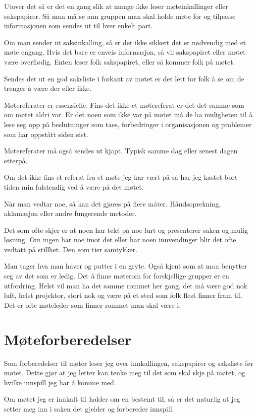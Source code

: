 \documentclass[12pt, a4paper]{article}
\begin{document}
Utover det så er det en gang slik at mange ikke leser møteinkallinger eller
sakspapirer. Så man må se ann gruppen man skal holde møte for og tilpasse
informasjonen som sendes ut til hver enkelt part.

Om man sender ut saksinkalling, så er det ikke sikkert det er nødvendig med et
møte engang. Hvis det bare er enveis informasjon, så vil sakspapiret eller
møtet være overflødig. Enten leser folk sakspapiret, eller så kommer folk på
møtet. 

Sendes det ut en god saksliste i forkant av møtet er det lett for folk å se om
de trenger å være der eller ikke. 

Møtereferater er essensielle. Fins det ikke et møtereferat er det det samme som
om møtet aldri var. Er det noen som ikke var på møtet må de ha muligheten til å
lese seg opp på beslutninger som taes, forbedringer i organisasjonen og
problemer som har oppstått siden sist. 

Møtereferater må også sendes ut kjapt. Typisk samme dag eller senest dagen
etterpå. 

Om det ikke fins et referat fra et møte jeg har vært på så har jeg kastet bort
tiden min fulstendig ved å være på det møtet. 

Når man vedtar noe, så kan det gjøres på flere måter. Håndsoprekning,
aklamasjon eller andre fungerende metoder. 

Det som ofte skjer er at noen har tekt på noe lurt og presenterer saken og
mulig løsning. Om ingen har noe imot det eller har noen innvendinger blir det
ofte vedtatt på stillhet. Den som tier samtykker. 

Man tager hva man haver og putter i en gryte. Også kjent som at man benytter
seg av det som er ledig. Det å finne møterom for forskjellige grupper er en
utfordring. Helst vil man ha det samme rommet her gang, det må være god nok
luft, helst projektor, stort nok og være på et sted som folk flest finner fram
til. Det er ofte møteleder som finner rommet man skal være i. 

\section{Møteforberedelser}
Som forberedelser til møter leser jeg over innkallingen, sakspapirer og
saksliste før møtet. Dette gjør at jeg letter kan tenke meg til det som skal
skje på møtet, og hvilke innspill jeg har å komme med. 

Om møtet jeg er innkalt til halder om en bestemt til, så er det naturlig at jeg
setter meg inn i saken det gjelder og forbereder innspill. 
\end{document}
